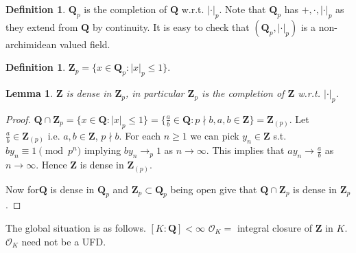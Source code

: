 \documentclass[10pt,]{book}
\newcommand{\lt}{<}
\theoremstyle{plain}
\newtheorem{lemma}[theorem]{Lemma}
\theoremstyle{definition}
\newtheorem{definition}[theorem]{Definition}
\newcommand{\QQ}{\mathbf{Q}}
\newcommand{\ZZ}{\mathbf{Z}}
\newcommand{\cO}{\mathcal{O}}
\newcommand{\ab}{|\cdot|}
\begin{document}
\begin{definition}\label{definition-3}
\(\QQ_p\) is the completion of \(\QQ\) w.r.t. \(\ab_p\).
          Note that \(\QQ_p\) has \(+,\cdot,\ab_p\) as they extend from \(\QQ\) by continuity.
          It is easy to check that \((\QQ_p,\ab_p)\) is a non-archimidean valued field.
        \end{definition}
\begin{definition}\label{definition-4}
\(\ZZ_p=\{x\in\QQ_p : |x|_p \le 1\}.\)\end{definition}
\begin{lemma}\label{lemma-2}
\(\ZZ\) is dense in \(\ZZ_p\), in particular \(\ZZ_p\) is the completion of \(\ZZ\) w.r.t. \(\ab_p\).\end{lemma}
\begin{proof}
\(\QQ\cap \ZZ_p = \{x\in\QQ: |x|_p \le 1\}= \{\frac{a}{b} \in \QQ : p \nmid b,a,b\in\ZZ\} = \ZZ_{(p)}\).
        Let \(\frac{a}{b} \in \ZZ_{(p)}\) i.e. \(a,b \in \ZZ\), \(p\nmid b\).
        For each \(n \ge 1\) we can pick \(y_n \in \ZZ\) s.t. \(by_n \equiv 1 \pmod{p^n}\) implying \(by_n \to_p 1\) as \(n \to \infty\).
        This implies that \(ay_n \to \frac{a}{b}\) as \(n\to \infty\).
        Hence \(\ZZ\) is dense in \(\ZZ_{(p)}\).

        Now for\(\QQ\) is dense in \(\QQ_p\) and \(\ZZ_p \subset \QQ_p\) being open give that \(\QQ\cap \ZZ_p\) is dense in \(\ZZ_p\).
        \end{proof}
\par

        The global situation is as follows.
        \([K: \QQ] \lt \infty  \) \(\cO_K = \) integral closure of \(\ZZ\) in \(K\).
        \(\cO_K\) need not be a UFD.
\par
\end{document}
